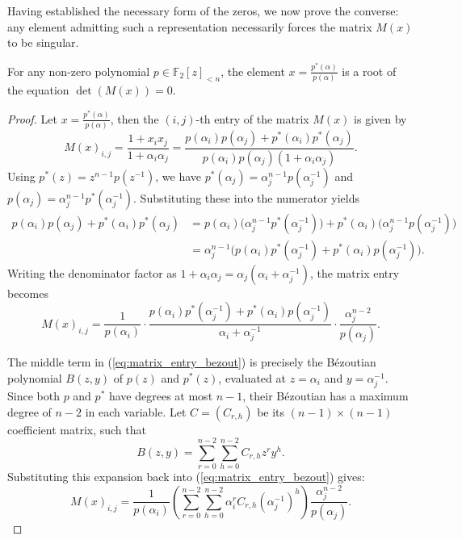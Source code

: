 \documentclass[hidelinks,onefignum,onetabnum]{siamart251216}
\theoremstyle{definition}
\theoremstyle{remark}
\begin{document}
Having established the necessary form of the zeros, we now prove the converse: any element admitting such a representation necessarily forces the matrix $M(x)$ to be singular.

\begin{proposition}
	\label{prop:sufficiency}
	For any non-zero polynomial $p \in \mathbb{F}_2[z]_{<n}$, the element $x = \displaystyle\frac{p^*(\alpha)}{p(\alpha)}$ is a root of the equation $\det(M(x)) = 0$.
\end{proposition}

\begin{proof}
	
	
	Let $x = \displaystyle\frac{p^*(\alpha)}{p(\alpha)}$, then the $(i, j)$-th entry of the matrix $M(x)$ is given by
	\begin{equation}
		M(x)_{i,j} = \frac{1 + x_i x_j}{1 + \alpha_i \alpha_j} = \frac{p(\alpha_i)p(\alpha_j) + p^*(\alpha_i)p^*(\alpha_j)}{p(\alpha_i)p(\alpha_j)(1 + \alpha_i \alpha_j)}.
	\end{equation}
	Using $p^*(z) = z^{n-1} p(z^{-1})$, we have $p^*(\alpha_j) = \alpha_j^{n-1} p(\alpha_j^{-1})$ and $p(\alpha_j) = \alpha_j^{n-1} p^*(\alpha_j^{-1})$. Substituting these into the numerator yields
	\begin{align*}
		p(\alpha_i)p(\alpha_j) + p^*(\alpha_i)p^*(\alpha_j) &= p(\alpha_i) \big(\alpha_j^{n-1} p^*(\alpha_j^{-1})\big) + p^*(\alpha_i) \big(\alpha_j^{n-1} p(\alpha_j^{-1})\big) \\
		&= \alpha_j^{n-1} \big( p(\alpha_i) p^*(\alpha_j^{-1}) + p^*(\alpha_i) p(\alpha_j^{-1}) \big).
	\end{align*}
	Writing the denominator factor as $1 + \alpha_i \alpha_j = \alpha_j (\alpha_i + \alpha_j^{-1})$, the matrix entry becomes
	\begin{equation}
		\label{eq:matrix_entry_bezout}
		M(x)_{i,j} = \frac{1}{p(\alpha_i)} \cdot \frac{p(\alpha_i) p^*(\alpha_j^{-1}) + p^*(\alpha_i) p(\alpha_j^{-1})}{\alpha_i + \alpha_j^{-1}}\cdot \frac{\alpha_j^{n-2}}{p(\alpha_j)}.
	\end{equation}
	
	The middle term in (\ref{eq:matrix_entry_bezout}) is precisely the B{\'e}zoutian polynomial $B(z, y)$ of $p(z)$ and $p^*(z)$, evaluated at $z = \alpha_i$ and $y = \alpha_j^{-1}$. Since both $p$ and $p^*$ have degrees at most $n-1$, their B{\'e}zoutian has a maximum degree of $n-2$ in each variable. Let $C = (C_{r,h})$ be its $(n-1) \times (n-1)$ coefficient matrix, such that
	\begin{equation}
		B(z, y) = \sum_{r=0}^{n-2} \sum_{h=0}^{n-2} C_{r,h} z^r y^h.
	\end{equation}
	Substituting this expansion back into (\ref{eq:matrix_entry_bezout}) gives:
	\begin{equation}
		M(x)_{i,j} = \frac{1}{p(\alpha_i)} \left( \sum_{r=0}^{n-2} \sum_{h=0}^{n-2} \alpha_i^r C_{r,h} (\alpha_j^{-1})^h \right) \frac{\alpha_j^{n-2}}{p(\alpha_j)}.
	\end{equation}
	

\end{proof}
\end{document}
